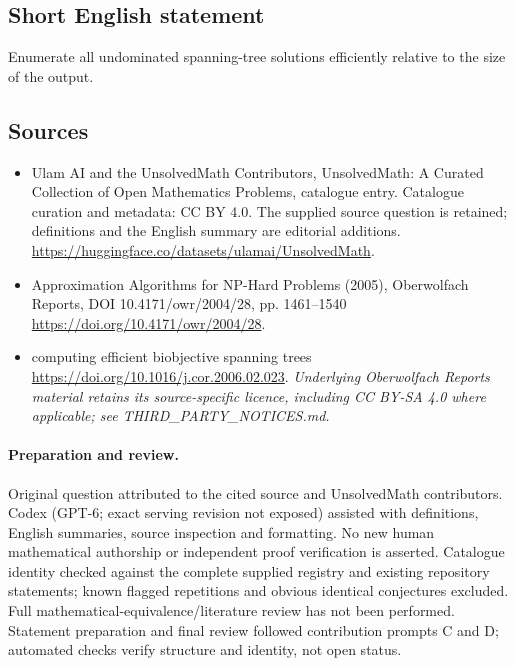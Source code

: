 \documentclass[11pt]{article}
\begin{document}
\subsection{Short English statement}
Enumerate all undominated spanning-tree solutions efficiently relative to the size of the output.
\subsection{Sources}
\begin{itemize}
\item[\hypertarget{source:statement:1}{S1}] Ulam AI and the UnsolvedMath Contributors, UnsolvedMath: A Curated Collection of Open Mathematics Problems, catalogue entry. Catalogue curation and metadata: CC BY 4.0. The supplied source question is retained; definitions and the English summary are editorial additions.
\url{https://huggingface.co/datasets/ulamai/UnsolvedMath}.
\item[\hypertarget{source:statement:2}{S2}] Approximation Algorithms for NP-Hard Problems (2005), Oberwolfach Reports, DOI 10.4171/owr/2004/28, pp. 1461--1540
\url{https://doi.org/10.4171/owr/2004/28}.
\item[\hypertarget{source:statement:3}{S3}] computing efficient biobjective spanning trees
\url{https://doi.org/10.1016/j.cor.2006.02.023}.
\textit{Underlying Oberwolfach Reports material retains its source-specific licence, including CC BY-SA 4.0 where applicable; see THIRD\_PARTY\_NOTICES.md.}
\end{itemize}
\paragraph{Preparation and review.}
Original question attributed to the cited source and UnsolvedMath contributors. Codex (GPT-6; exact serving revision not exposed) assisted with definitions, English summaries, source inspection and formatting. No new human mathematical authorship or independent proof verification is asserted. Catalogue identity checked against the complete supplied registry and existing repository statements; known flagged repetitions and obvious identical conjectures excluded. Full mathematical-equivalence/literature review has not been performed. Statement preparation and final review followed contribution prompts C and D; automated checks verify structure and identity, not open status.
\label{end:statement}
\end{document}
